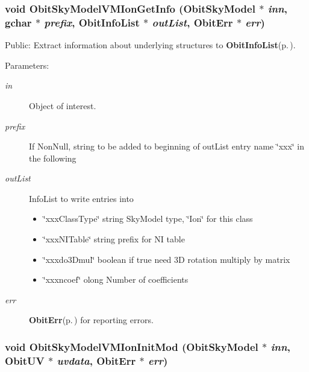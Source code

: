 \subsubsection{\setlength{\rightskip}{0pt plus 5cm}void Obit\-Sky\-Model\-VMIon\-Get\-Info ({\bf Obit\-Sky\-Model} $\ast$ {\em inn}, gchar $\ast$ {\em prefix}, {\bf Obit\-Info\-List} $\ast$ {\em out\-List}, {\bf Obit\-Err} $\ast$ {\em err})}\label{ObitSkyModelVMIon_8h_a14}


Public: Extract information about underlying structures to {\bf Obit\-Info\-List}{\rm (p.\,\pageref{structObitInfoList})}. 

\begin{Desc}
\item[Parameters:]
\begin{description}
\item[{\em in}]Object of interest. \item[{\em prefix}]If Non\-Null, string to be added to beginning of out\-List entry name \char`\"{}xxx\char`\"{} in the following \item[{\em out\-List}]Info\-List to write entries into \begin{itemize}
\item \char`\"{}xxx\-Class\-Type\char`\"{} string Sky\-Model type, \char`\"{}Ion\char`\"{} for this class \item \char`\"{}xxx\-NITable\char`\"{} string prefix for NI table \item \char`\"{}xxxdo3Dmul\char`\"{} boolean if true need 3D rotation multiply by matrix \item \char`\"{}xxxncoef\char`\"{} olong Number of coefficients \end{itemize}
\item[{\em err}]{\bf Obit\-Err}{\rm (p.\,\pageref{structObitErr})} for reporting errors. \end{description}
\end{Desc}
\subsubsection{\setlength{\rightskip}{0pt plus 5cm}void Obit\-Sky\-Model\-VMIon\-Init\-Mod ({\bf Obit\-Sky\-Model} $\ast$ {\em inn}, {\bf Obit\-UV} $\ast$ {\em uvdata}, {\bf Obit\-Err} $\ast$ {\em err})}\label{ObitSkyModelVMIon_8h_a7}


